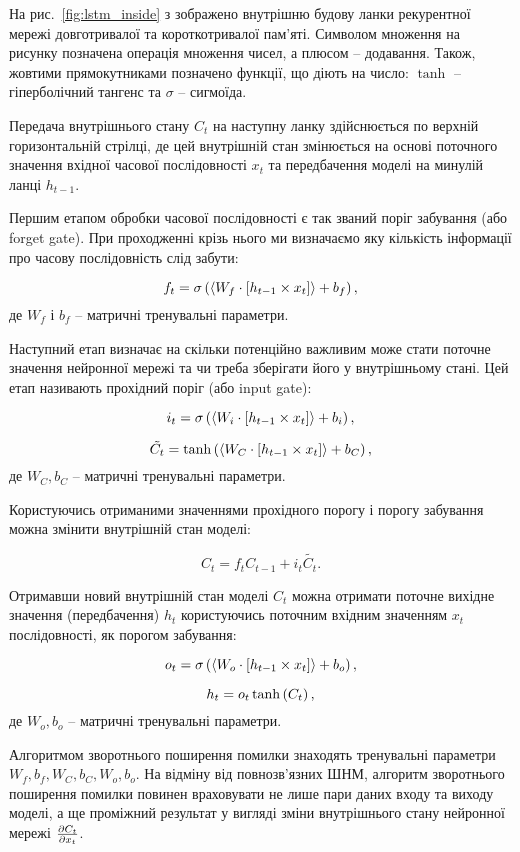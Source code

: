 На рис.~\ref{fig:lstm_inside} з \cite{imp:Varsamopoulos2018} зображено 
внутрішню будову ланки рекурентної мережі довготривалої та короткотривалої 
пам'яті. Символом множення на рисунку позначена операція множення чисел, а 
плюсом -- додавання. Також, жовтими прямокутниками позначено функції, що діють 
на число: $ \tanh $ -- гіперболічний тангенс та $ \sigma $ -- сигмоїда.

Передача внутрішнього стану $ C_t $ на наступну ланку здійснюється по 
верхній горизонтальній стрілці, де цей внутрішній стан змінюється на основі
поточного значення вхідної часової послідовності $ x_t $ та передбачення 
моделі на минулій ланці $ h_{t-1} $.

Першим етапом обробки часової послідовності є так званий поріг забування
(або forget gate). При проходженні крізь нього ми визначаємо яку 
кількість інформації про часову послідовність слід забути:

\begin{equation}
f_t = \sigma \left( \left< W_f \cdot \left[ h_{t-1} \times x_t \right] \right> + b_f \right),
\end{equation}
%
де $ W_f $ і $ b_f $ -- матричні тренувальні параметри.

Наступний етап визначає на скільки потенційно важливим може стати поточне 
значення нейронної мережі та чи треба зберігати його у внутрішньому стані. 
Цей етап називають прохідний поріг (або input gate):

\begin{equation}
i_t = \sigma \left( \left< W_i \cdot \left[ h_{t-1} \times x_t \right] \right> + b_i \right),
\end{equation}

\begin{equation}
\tilde{C_t} = \tanh \left( \left< W_C \cdot \left[ h_{t-1} \times x_t \right] \right> + b_C \right),
\end{equation}
%
де $ W_C, b_C $ -- матричні тренувальні параметри.

Користуючись отриманими значеннями прохідного порогу і порогу забування
можна змінити внутрішній стан моделі:

\begin{equation}
C_t = f_t C_{t-1} + i_t \tilde{C_t}.
\end{equation}

Отримавши новий внутрішній стан моделі $ C_t $ можна отримати поточне вихідне 
значення (передбачення) $ h_t $ користуючись поточним вхідним значенням 
$ x_t $ послідовності, як порогом забування:

\begin{equation}
o_t = \sigma \left( \left< W_o \cdot \left[ h_{t-1} \times x_t \right] \right> + b_o \right),
\end{equation}

\begin{equation}
h_t = o_t \tanh \left( C_t \right),
\end{equation}
%
де $ W_o, b_o $ -- матричні тренувальні параметри.

Алгоритмом зворотнього поширення помилки знаходять тренувальні 
параметри $ W_f, b_f, W_C, b_C, W_o, b_o $. На відміну від повнозв'язних ШНМ, 
алгоритм зворотнього поширення помилки повинен враховувати не лише пари даних 
входу та виходу моделі, а ще проміжний результат у вигляді зміни внутрішнього 
стану нейронної мережі $ \frac{\partial C_t}{\partial x_t} $.
